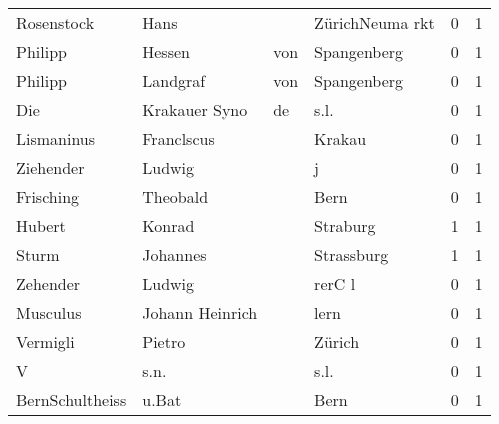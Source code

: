 \documentclass[10pt,a4paper,landscape]{article}
\begin{document}
\begin{longtable}{llllrr}
               Rosenstock &                               Hans &             &                             ZürichNeuma rkt &          0 &         1 \\
                  Philipp &                             Hessen &         von &                                 Spangenberg &          0 &         1 \\
                  Philipp &                           Landgraf &         von &                                 Spangenberg &          0 &         1 \\
                      Die &                      Krakauer Syno &          de &                                        s.l. &          0 &         1 \\
               Lismaninus &                         Franclscus &             &                                      Krakau &          0 &         1 \\
                Ziehender &                             Ludwig &             &                                           j &          0 &         1 \\
                Frisching &                           Theobald &             &                                        Bern &          0 &         1 \\
                   Hubert &                             Konrad &             &                                    Straburg &          1 &         1 \\
                    Sturm &                           Johannes &             &                                  Strassburg &          1 &         1 \\
                 Zehender &                             Ludwig &             &                                      rerC l &          0 &         1 \\
                 Musculus &                    Johann Heinrich &             &                                        lern &          0 &         1 \\
                 Vermigli &                             Pietro &             &                                      Zürich &          0 &         1 \\
                        V &                               s.n. &             &                                        s.l. &          0 &         1 \\
          BernSchultheiss &                              u.Bat &             &                                        Bern &          0 &         1 \\

\end{longtable}
\end{document}
